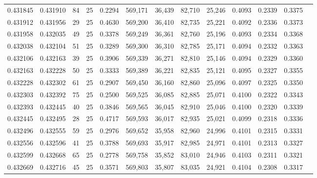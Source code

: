 \begin{tabular}{rrrrrrrrrrrrr}
0.431845 & 0.431910 &    84 &  25 &                                     0.2294 & 569,171 &  36,439 &  82,710 &  25,246 & 0.4093 & 0.2339 & 0.3375 \\
0.431912 & 0.431956 &    29 &  25 &                                     0.4630 & 569,200 &  36,410 &  82,735 &  25,221 & 0.4092 & 0.2336 & 0.3373 \\
0.431958 & 0.432035 &    49 &  25 &                                     0.3378 & 569,249 &  36,361 &  82,760 &  25,196 & 0.4093 & 0.2334 & 0.3368 \\
0.432038 & 0.432104 &    51 &  25 &                                     0.3289 & 569,300 &  36,310 &  82,785 &  25,171 & 0.4094 & 0.2332 & 0.3363 \\
0.432106 & 0.432163 &    39 &  25 &                                     0.3906 & 569,339 &  36,271 &  82,810 &  25,146 & 0.4094 & 0.2329 & 0.3360 \\
0.432163 & 0.432228 &    50 &  25 &                                     0.3333 & 569,389 &  36,221 &  82,835 &  25,121 & 0.4095 & 0.2327 & 0.3355 \\
0.432228 & 0.432302 &    61 &  25 &                                     0.2907 & 569,450 &  36,160 &  82,860 &  25,096 & 0.4097 & 0.2325 & 0.3350 \\
0.432303 & 0.432392 &    75 &  25 &                                     0.2500 & 569,525 &  36,085 &  82,885 &  25,071 & 0.4100 & 0.2322 & 0.3343 \\
0.432393 & 0.432445 &    40 &  25 &                                     0.3846 & 569,565 &  36,045 &  82,910 &  25,046 & 0.4100 & 0.2320 & 0.3339 \\
0.432445 & 0.432495 &    28 &  25 &                                     0.4717 & 569,593 &  36,017 &  82,935 &  25,021 & 0.4099 & 0.2318 & 0.3336 \\
0.432496 & 0.432555 &    59 &  25 &                                     0.2976 & 569,652 &  35,958 &  82,960 &  24,996 & 0.4101 & 0.2315 & 0.3331 \\
0.432556 & 0.432596 &    41 &  25 &                                     0.3788 & 569,693 &  35,917 &  82,985 &  24,971 & 0.4101 & 0.2313 & 0.3327 \\
0.432599 & 0.432668 &    65 &  25 &                                     0.2778 & 569,758 &  35,852 &  83,010 &  24,946 & 0.4103 & 0.2311 & 0.3321 \\
0.432669 & 0.432716 &    45 &  25 &                                     0.3571 & 569,803 &  35,807 &  83,035 &  24,921 & 0.4104 & 0.2308 & 0.3317 \\

\end{tabular}
